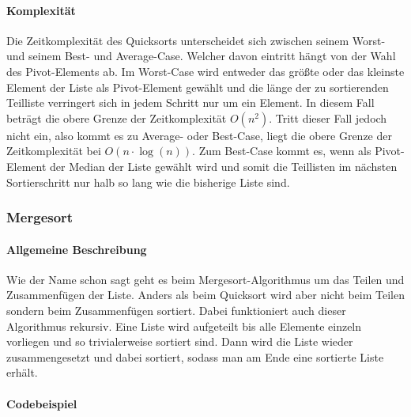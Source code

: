 \documentclass{article}
\begin{document}
	\paragraph{Komplexität}
	
	Die Zeitkomplexität des Quicksorts unterscheidet sich zwischen seinem Worst- und seinem Best- und Average-Case. Welcher davon eintritt hängt von der Wahl des Pivot-Elements ab. Im Worst-Case wird entweder das größte oder das kleinste Element der Liste als Pivot-Element gewählt und die länge der zu sortierenden Teilliste verringert sich in jedem Schritt nur um ein Element. In diesem Fall beträgt die obere Grenze der Zeitkomplexität $O(n^2)$. Tritt dieser Fall jedoch nicht ein, also kommt es zu Average- oder Best-Case, liegt die obere Grenze der Zeitkomplexität bei $O(n \cdot \log(n))$. Zum Best-Case kommt es, wenn als Pivot-Element der Median der Liste gewählt wird und somit die Teillisten im nächsten Sortierschritt nur halb so lang wie die bisherige Liste sind. 
	
	\subsubsection{Mergesort}
	
	\paragraph{Allgemeine Beschreibung}
	
	Wie der Name schon sagt geht es beim Mergesort-Algorithmus um das Teilen und Zusammenfügen der Liste. Anders als beim Quicksort wird aber nicht beim Teilen sondern beim Zusammenfügen sortiert. Dabei funktioniert auch dieser Algorithmus rekursiv. Eine Liste wird aufgeteilt bis alle Elemente einzeln vorliegen und so trivialerweise sortiert sind. Dann wird die Liste wieder zusammengesetzt und dabei sortiert, sodass man am Ende eine sortierte Liste erhält.
	
	\paragraph{Codebeispiel}
	
\end{document}
